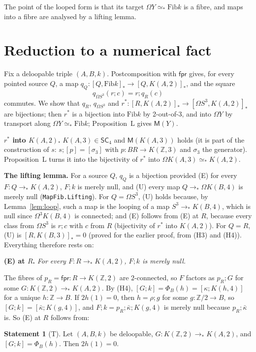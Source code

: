 \documentclass[11pt]{amsart}
\theoremstyle{definition}
\newtheorem{statement}[theorem]{Statement}
\theoremstyle{remark}
\newcommand{\Om}{\Omega}
\newcommand{\Z}{\mathbb{Z}}
\newcommand{\code}[1]{\texttt{#1}}
\newcommand{\hc}[2]{[#1,#2]_*}
\newcommand{\Fib}{\mathrm{Fib}}
\newcommand{\fpr}{\mathsf{fpr}}
\newcommand{\cls}[1]{[#1]}
\newcommand{\kb}{\bar\kappa}
\newcommand{\SCf}{\mathsf{SC}_4}
\newcommand{\pteq}{\simeq_*}
\begin{document}
The point of the looped form is that its target $\Om Y\pteq\Fib k$ is a fibre,
and maps into a fibre are analysed by a lifting lemma.

\section{Reduction to a numerical fact}\label{s:red}

Fix a deloopable triple $(A,B,k)$. Postcomposition with $\fpr$ gives, for every
pointed source $Q$, a map $q_Q:\hc{Q}{\Fib k}\to\hc{Q}{K(A,2)}$, and the square
\[
  q_{\Om S^3}(r;c)=r;q_R(c)
\]
commutes. We show that $q_R$, $q_{\Om S^3}$ and $r^*:\hc R{K(A,2)}\to\hc{\Om
S^3}{K(A,2)}$ are bijections; then $r^*$ is a bijection into $\Fib k$ by
2-out-of-3, and into $\Om Y$ by transport along $\Om Y\pteq\Fib k$; Proposition~L
gives $\mathsf M(Y)$.

\smallskip\noindent\textbf{$r^*$ into $K(A,2)$.} $K(A,3)\in\SCf$ and
$\mathsf M(K(A,3))$ holds (it is part of the construction of $s$:
$s;\cls p=\cls{\sigma_3}$ with $p:BR\to K(\Z,3)$ and $\sigma_3$ the generator).
Proposition~L turns it into the bijectivity of $r^*$ into $\Om K(A,3)\pteq
K(A,2)$.

\smallskip\noindent\textbf{The lifting lemma.} For a source $Q$, $q_Q$ is a
bijection provided (E) for every $F:Q\to_*K(A,2)$, $F;k$ is merely null, and
(U) every map $Q\to_*\Om K(B,4)$ is merely null (\code{MapFib.Lifting}). For
$Q=\Om S^3$, (U) holds because, by Lemma~\ref{lem:loop}, such a map is the
looping of a map $S^3\to_*K(B,4)$, which is null since $\Om^3K(B,4)$ is
connected; and (E) follows from (E) at $R$, because every class from $\Om S^3$
is $r;c$ with $c$ from $R$ (bijectivity of $r^*$ into $K(A,2)$). For $Q=R$,
(U) is $\hc{R}{K(B,3)}=0$ (proved for the earlier proof, from (H3) and (H4)).
Everything therefore rests on:

\smallskip\noindent\textbf{(E) at $R$.} \emph{For every $F:R\to_*K(A,2)$, $F;k$
is merely null.}

\smallskip\noindent The fibres of $p_R=\fpr:R\to K(\Z,2)$ are $2$-connected,
so $F$ factors as $p_R;G$ for some $G:K(\Z,2)\to_*K(A,2)$. By (H4),
$\cls{G;k}=\Phi_B(h)=\cls{\kappa;K(h,4)}$ for a unique $h:\Z\to B$. If
$2h(1)=0$, then $h=\rho;g$ for some $g:\Z/2\to B$, so
$\cls{G;k}=\cls{\kb;K(g,4)}$, and $F;k=p_R;\kb;K(g,4)$ is merely null because
$p_R;\kb$ is. So (E) at $R$ follows from:

\begin{statement}[T]\label{st:T}
Let $(A,B,k)$ be deloopable, $G:K(\Z,2)\to_*K(A,2)$, and $\cls{G;k}=\Phi_B(h)$.
Then $2h(1)=0$.
\end{statement}
\end{document}
